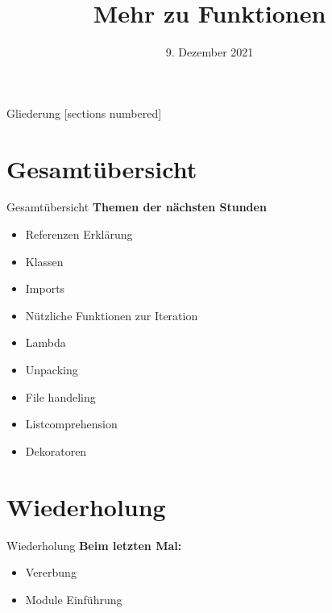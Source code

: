 



\title{Mehr zu Funktionen}
\date{9. Dezember 2021}


	
\maketitle

\begin{frame}{Gliederung}
	[sections numbered]
	\tableofcontents
\end{frame}

\section*{Gesamtübersicht}
\begin{frame}{Gesamtübersicht}
	\textbf{Themen der nächsten Stunden}
	\begin{itemize}
		\item Referenzen Erklärung
		\item  Klassen
		\item Imports
		\item Nützliche Funktionen zur Iteration
		\item \alert{Lambda}
		\item \alert{Unpacking}
		\item File handeling
		\item Listcomprehension
		\item Dekoratoren
	\end{itemize}
\end{frame}

\section{Wiederholung}
\begin{frame}{Wiederholung}
	\textbf{Beim letzten Mal:}
	\begin{itemize}
		\item Vererbung
		
		\item Module Einführung
		
	\end{itemize}	
\end{frame}

